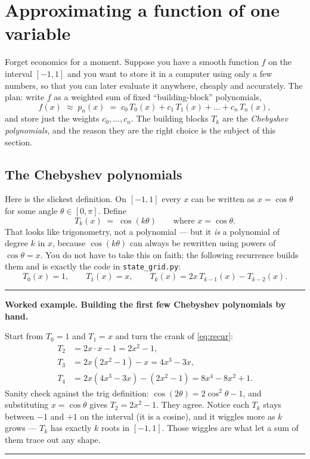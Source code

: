 \documentclass[11pt]{article}
\newcommand{\demohead}[1]{\par\smallskip\noindent%
  \textcolor{democ}{\rule{\linewidth}{0.7pt}}\par\nobreak\vspace{2pt}%
  \noindent\textbf{\textcolor{democ}{Worked example.} #1}\par\nobreak\vspace{2pt}}
\newcommand{\demofoot}{\par\vspace{2pt}\noindent%
  \textcolor{democ}{\rule{\linewidth}{0.7pt}}\par\smallskip}
\newcommand{\code}[1]{\texttt{#1}}
\begin{document}
\section{Approximating a function of one variable}
\label{sec:cheb}

Forget economics for a moment. Suppose you have a smooth function $f$ on the
interval $[-1,1]$ and you want to store it in a computer using only a few
numbers, so that you can later evaluate it anywhere, cheaply and accurately.
The plan: write $f$ as a weighted sum of fixed ``building-block''
polynomials,
\[
f(x)\;\approx\; p_n(x)\;=\;c_0\,T_0(x)+c_1\,T_1(x)+\dots+c_n\,T_n(x),
\]
and store just the weights $c_0,\dots,c_n$. The building blocks $T_k$ are the
\emph{Chebyshev polynomials}, and the reason they are the right choice is the
subject of this section.

\subsection{The Chebyshev polynomials}

Here is the slickest definition. On $[-1,1]$ every $x$ can be written as
$x=\cos\theta$ for some angle $\theta\in[0,\pi]$. Define
\[
T_k(x)\;=\;\cos(k\theta)\qquad\text{where }x=\cos\theta.
\]
That looks like trigonometry, not a polynomial --- but it \emph{is} a
polynomial of degree $k$ in $x$, because $\cos(k\theta)$ can always be
rewritten using powers of $\cos\theta = x$. You do not have to take this on
faith; the following recurrence builds them and is exactly the code in
\code{state\_grid.py}:
\begin{equation}
T_0(x)=1,\qquad T_1(x)=x,\qquad
T_{k}(x)=2x\,T_{k-1}(x)-T_{k-2}(x).
\label{eq:recur}
\end{equation}

\demohead{Building the first few Chebyshev polynomials by hand.}
Start from $T_0=1$ and $T_1=x$ and turn the crank of \eqref{eq:recur}:
\[
\begin{aligned}
T_2 &= 2x\cdot x - 1 = 2x^2-1,\\
T_3 &= 2x(2x^2-1) - x = 4x^3-3x,\\
T_4 &= 2x(4x^3-3x) - (2x^2-1) = 8x^4-8x^2+1.
\end{aligned}
\]
Sanity check against the trig definition: $\cos(2\theta)=2\cos^2\theta-1$, and
substituting $x=\cos\theta$ gives $T_2=2x^2-1$. They agree. Notice each
$T_k$ stays between $-1$ and $+1$ on the interval (it is a cosine), and it
wiggles more as $k$ grows --- $T_k$ has exactly $k$ roots in $[-1,1]$. Those
wiggles are what let a sum of them trace out any shape.
\demofoot
\end{document}
